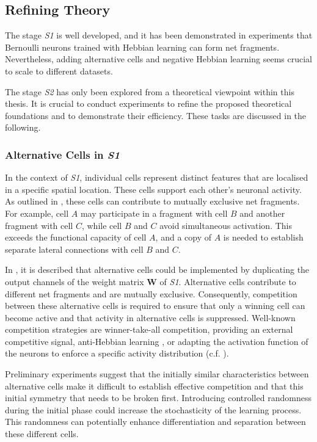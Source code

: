 \subsection{Refining Theory}
The stage \emph{S1} is well developed, and it has been demonstrated in experiments that Bernoulli neurons trained with Hebbian learning can form net fragments. Nevertheless, adding alternative cells and negative Hebbian learning seems crucial to scale to different datasets.

The stage \emph{S2} has only been explored from a theoretical viewpoint within this thesis. It is crucial to conduct experiments to refine the proposed theoretical foundations and to demonstrate their efficiency.
These tasks are discussed in the following.


\subsubsection{Alternative Cells in \emph{S1}}
In the context of \emph{S1}, individual cells represent distinct features that are localised in a specific spatial location. These cells support each other's neuronal activity. As outlined in , these cells can contribute to mutually exclusive net fragments. For example, cell $A$ may participate in a fragment with cell $B$ and another fragment with cell $C$, while cell $B$ and $C$ avoid simultaneous activation. This exceeds the functional capacity of cell $A$, and a copy of $A$ is needed to establish separate lateral connections with cell $B$ and $C$.

In , it is described that alternative cells could be implemented by duplicating the output channels of the weight matrix $\boldsymbol{W}$ of \emph{S1}.
Alternative cells contribute to different net fragments and are mutually exclusive.
Consequently, competition between these alternative cells is required to ensure that only a winning cell can become active and that activity in alternative cells is suppressed.
Well-known competition strategies are winner-take-all competition, providing an external competitive signal, anti-Hebbian learning , or adapting the activation function of the neurons to enforce a specific activity distribution  (c.f. ).

Preliminary experiments suggest that the initially similar characteristics between alternative cells make it difficult to establish effective competition and that this initial symmetry that needs to be broken first.
Introducing controlled randomness during the initial phase could increase the stochasticity of the learning process. This randomness can potentially enhance differentiation and separation between these different cells.


